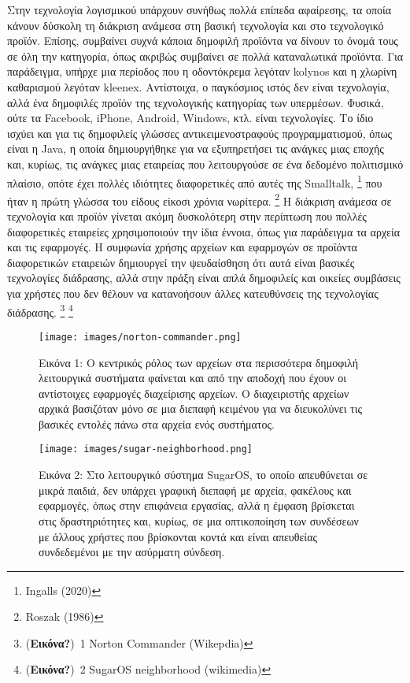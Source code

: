 \documentclass[
]{article}
\begin{document}
Στην τεχνολογία λογισμικού υπάρχουν συνήθως πολλά επίπεδα αφαίρεσης, τα
οποία κάνουν δύσκολη τη διάκριση ανάμεσα στη βασική τεχνολογία και στο
τεχνολογικό προϊόν. Επίσης, συμβαίνει συχνά κάποια δημοφιλή προϊόντα να
δίνουν το όνομά τους σε όλη την κατηγορία, όπως ακριβώς συμβαίνει σε
πολλά καταναλωτικά προϊόντα. Για παράδειγμα, υπήρχε μια περίοδος που η
οδοντόκρεμα λεγόταν kolynos και η χλωρίνη καθαρισμού λεγόταν kleenex.
Αντίστοιχα, ο παγκόσμιος ιστός δεν είναι τεχνολογία, αλλά ένα δημοφιλές
προϊόν της τεχνολογικής κατηγορίας των υπερμέσων. Φυσικά, ούτε τα
Facebook, iPhone, Android, Windows, κτλ. είναι τεχνολογίες. Το ίδιο
ισχύει και για τις δημοφιλείς γλώσσες αντικειμενοστραφούς
προγραμματισμού, όπως είναι η Java, η οποία δημιουργήθηκε για να
εξυπηρετήσει τις ανάγκες μιας εποχής και, κυρίως, τις ανάγκες μιας
εταιρείας που λειτουργούσε σε ένα δεδομένο πολιτισμικό πλαίσιο, οπότε
έχει πολλές ιδιότητες διαφορετικές από αυτές της Smalltalk, \footnote{Ingalls
  (2020)} που ήταν η πρώτη γλώσσα του είδους είκοσι χρόνια νωρίτερα.
\footnote{Roszak (1986)} Η διάκριση ανάμεσα σε τεχνολογία και προϊόν
γίνεται ακόμη δυσκολότερη στην περίπτωση που πολλές διαφορετικές
εταιρείες χρησιμοποιούν την ίδια έννοια, όπως για παράδειγμα τα αρχεία
και τις εφαρμογές. Η συμφωνία χρήσης αρχείων και εφαρμογών σε προϊόντα
διαφορετικών εταιρειών δημιουργεί την ψευδαίσθηση ότι αυτά είναι βασικές
τεχνολογίες διάδρασης, αλλά στην πράξη είναι απλά δημοφιλείς και οικείες
συμβάσεις για χρήστες που δεν θέλουν να κατανοήσουν άλλες κατευθύνσεις
της τεχνολογίας διάδρασης. \footnote{(\textbf{Εικόνα?})~1 Norton
  Commander (Wikepdia)} \footnote{(\textbf{Εικόνα?})~2 SugarOS
  neighborhood (wikimedia)}

\leavevmode{}%
\begin{figure}
\hypertarget{fig:norton-commander}{%
\centering
\texttt{[image: images/norton-commander.png]}
\caption{Εικόνα 1: Ο κεντρικός ρόλος των αρχείων στα περισσότερα
δημοφιλή λειτουργικά συστήματα φαίνεται και από την αποδοχή που έχουν οι
αντίστοιχες εφαρμογές διαχείρισης αρχείων. Ο διαχειριστής αρχείων αρχικά
βασιζόταν μόνο σε μια διεπαφή κειμένου για να διευκολύνει τις βασικές
εντολές πάνω στα αρχεία ενός συστήματος.}\label{fig:norton-commander}
}
\end{figure}

\leavevmode{}%
\begin{figure}
\hypertarget{fig:sugar-neighborhood}{%
\centering
\texttt{[image: images/sugar-neighborhood.png]}
\caption{Εικόνα 2: Στο λειτουργικό σύστημα SugarOS, το οποίο απευθύνεται
σε μικρά παιδιά, δεν υπάρχει γραφική διεπαφή με αρχεία, φακέλους και
εφαρμογές, όπως στην επιφάνεια εργασίας, αλλά η έμφαση βρίσκεται στις
δραστηριότητες και, κυρίως, σε μια οπτικοποίηση των συνδέσεων με άλλους
χρήστες που βρίσκονται κοντά και είναι απευθείας συνδεδεμένοι με την
ασύρματη σύνδεση.}\label{fig:sugar-neighborhood}
}
\end{figure}
\end{document}

